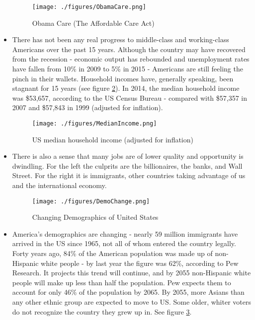 \documentclass{sig-alternate-05-2015}
\begin{document}
\begin{itemize}

\begin{figure}[!t]
\centering
\texttt{[image: ./figures/ObamaCare.png]}
\caption{Obama Care (The Affordable Care Act)}
\label{ObamaCare}
\end{figure}

\item There has not been any real progress to middle-class and working-class Americans over the past 15 years\cite{BBC}. Although the country may have recovered from the recession - economic output has rebounded and unemployment rates have fallen from 10\% in 2009 to 5\% in 2015 - Americans are still feeling the pinch in their wallets. Household incomes have, generally speaking, been stagnant for 15 years (see figure \ref{MedianIncome}). In 2014, the median household income was \$53,657, according to the US Census Bureau - compared with \$57,357 in 2007 and \$57,843 in 1999 (adjusted for inflation).

\begin{figure}[!t]
\centering
\texttt{[image: ./figures/MedianIncome.png]}
\caption{US median household income (adjusted for inflation)\cite{BBC}}
\label{MedianIncome}
\end{figure}

\item There is also a sense that many jobs are of lower quality and opportunity is dwindling\cite{BBC}. For the left the culprits are the billionaires, the banks, and Wall Street. For the right it is immigrants, other countries taking advantage of us and the international economy.

\begin{figure}[!t]
\centering
\texttt{[image: ./figures/DemoChange.png]}
\caption{Changing Demographics of United States}
\label{DemoChange}
\end{figure}

\item America's demographics are changing\cite{BBC} - nearly 59 million immigrants have arrived in the US since 1965, not all of whom entered the country legally. Forty years ago, 84\% of the American population was made up of non-Hispanic white people - by last year the figure was 62\%, according to Pew Research. It projects this trend will continue, and by 2055 non-Hispanic white people will make up less than half the population. Pew expects them to account for only 46\% of the population by 2065. By 2055, more Asians than any other ethnic group are expected to move to US. Some older, whiter voters do not recognize the country they grew up in. See figure \ref{DemoChange}.


\end{itemize}
\end{document}
